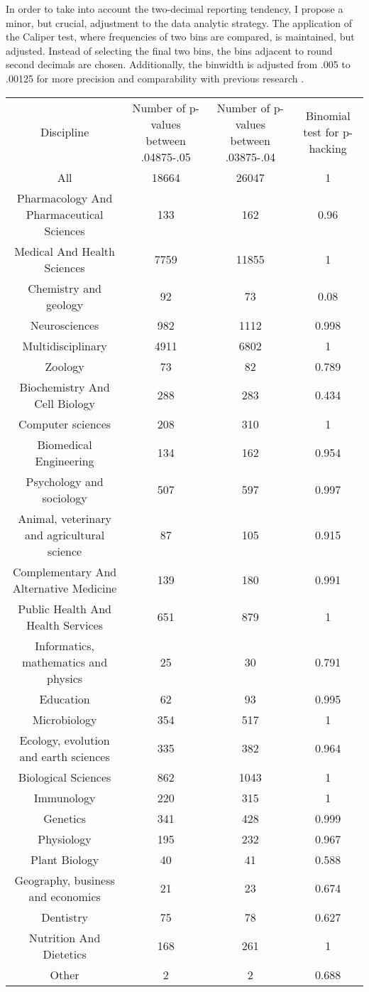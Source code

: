 In order to take into account the two-decimal reporting tendency, I propose a minor, but crucial, adjustment to the data analytic strategy. The application of the Caliper test, where frequencies of two bins are compared, is maintained, but adjusted. Instead of selecting the final two bins, the bins adjacent to round second decimals are chosen. Additionally, the binwidth is adjusted from .005 to .00125 for more precision and comparability with previous research \cite{Masicampo2012, Leggett2013}.

\begin{tabular}{ c c c c }
     Discipline & Number of p-values between .04875-.05 & Number of p-values between .03875-.04 & Binomial test for p-hacking \\
    All   & 18664 & 26047 & 1 \\
    Pharmacology And Pharmaceutical Sciences & 133   & 162   & 0.96 \\
    Medical And Health Sciences & 7759  & 11855 & 1 \\
    Chemistry and geology & 92    & 73    & 0.08 \\
    Neurosciences & 982   & 1112  & 0.998 \\
    Multidisciplinary & 4911  & 6802  & 1 \\
    Zoology & 73    & 82    & 0.789 \\
    Biochemistry And Cell Biology & 288   & 283   & 0.434 \\
    Computer sciences & 208   & 310   & 1 \\
    Biomedical Engineering & 134   & 162   & 0.954 \\
    Psychology and sociology & 507   & 597   & 0.997 \\
    Animal, veterinary and agricultural science & 87    & 105   & 0.915 \\
    Complementary And Alternative Medicine & 139   & 180   & 0.991 \\
    Public Health And Health Services & 651   & 879   & 1 \\
    Informatics, mathematics and physics & 25    & 30    & 0.791 \\
    Education & 62    & 93    & 0.995 \\
    Microbiology & 354   & 517   & 1 \\
    Ecology, evolution and earth sciences & 335   & 382   & 0.964 \\
    Biological Sciences & 862   & 1043  & 1 \\
    Immunology & 220   & 315   & 1 \\
    Genetics & 341   & 428   & 0.999 \\
    Physiology & 195   & 232   & 0.967 \\
    Plant Biology & 40    & 41    & 0.588 \\
    Geography, business and economics & 21    & 23    & 0.674 \\
    Dentistry & 75    & 78    & 0.627 \\
    Nutrition And Dietetics & 168   & 261   & 1 \\
    Other & 2     & 2     & 0.688 \\
\end{tabular}